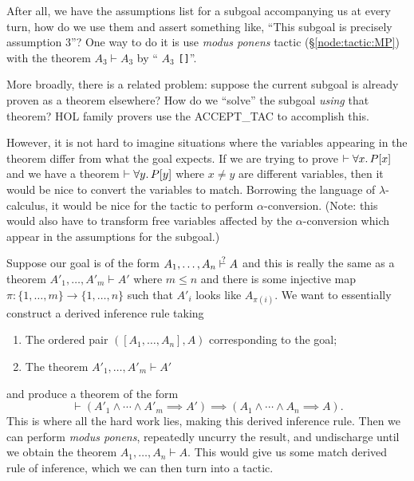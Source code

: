 \begin{node}
After all, we have the assumptions list for a subgoal accompanying us
at every turn, how do we use them and assert something like, ``This subgoal is precisely assumption 3''?
One way to do it is use \textit{modus ponens} tactic (\S\ref{node:tactic:MP})
with the theorem $A_{3}\vdash A_{3}$ by ``{\Tt{}\nwendquote} $A_{3}$ \texttt{[]}''.
\end{node}

\begin{node}
More broadly, there is a related problem: suppose the current subgoal
is already proven as a theorem elsewhere? How do we ``solve'' the
subgoal \emph{using} that theorem? HOL family provers use the
{\Tt{}ACCEPT{\_}TAC\nwendquote} to accomplish this.

However, it is not hard to imagine situations where the variables
appearing in the theorem differ from what the goal expects. If we are
trying to prove $\vdash\forall x\ldotp P[x]$ and we have a theorem
$\vdash\forall y\ldotp P[y]$ where $x\neq y$ are different variables,
then it would be nice to convert the variables to match. Borrowing the
language of $\lambda$-calculus, it would be nice for the tactic to
perform $\alpha$-conversion. (Note: this would also have to transform
free variables affected by the $\alpha$-conversion which appear in the
assumptions for the subgoal.)
\end{node}

\begin{node}
Suppose our goal is of the form $A_{1},\dots,A_{n}\vdash^{\mkern-8.75mu\scriptstyle\rule[-.9ex]{0pt}{0pt}?} A$ and this
is really the same as a theorem $A'_{1},\dots,A'_{m}\vdash A'$ where
$m\leq n$ and there is some injective map $\pi\colon\{1,\dots,m\}\to\{1,\dots,n\}$
such that $A'_{i}$ looks like $A_{\pi(i)}$. We want to essentially
construct a derived inference rule taking
\begin{enumerate}
\item The ordered pair $([A_{1},\dots,A_{n}], A)$ corresponding to the goal;
\item The theorem $A'_{1},\dots,A'_{m}\vdash A'$
\end{enumerate}
and produce a theorem of the form
\begin{equation*}
\vdash(A'_{1}\land\cdots\land A'_{m}\implies A')\implies(A_{1}\land\cdots\land A_{n}\implies A).
\end{equation*}
This is where all the hard work lies, making this derived inference
rule. Then we can perform \textit{modus ponens}, repeatedly uncurry
the result, and undischarge until we obtain the theorem $A_{1},\dots,A_{n}\vdash A$.
This would give us some {\Tt{}match\nwendquote} derived rule of inference, which we
can then turn into a tactic.
\end{node}



